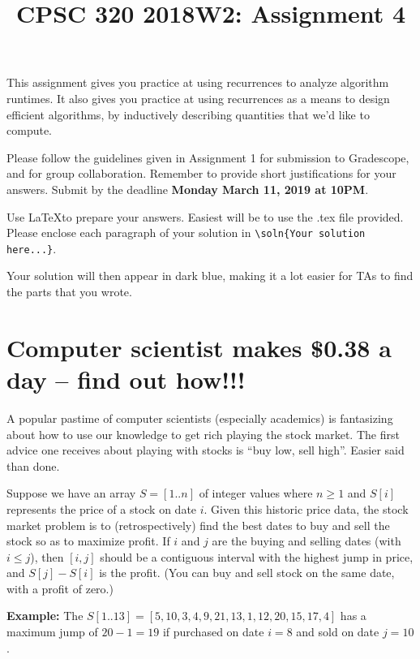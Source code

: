 \documentclass[11pt]{article}
\date{}
\title{CPSC 320 2018W2: Assignment 4}
\def\soln#1{\par\blu{#1}} %
\def\blu#1{{\color{blu}#1}}
\begin{document}
\maketitle
\vspace{-0.5in}

This assignment gives you practice at using recurrences to analyze
algorithm runtimes. It also gives you practice at using recurrences as
a means to design efficient algorithms, by inductively describing
quantities that we'd like to compute.

Please follow the guidelines given in Assignment 1 for submission to
Gradescope, and for group collaboration. Remember to provide short
justifications for your answers. Submit by the deadline \textbf{Monday 
March 11, 2019 at 10PM}.

Use \LaTeX to prepare your answers. Easiest will be to use the .tex
file provided.  Please enclose each paragraph of your solution in
\verb~\soln{Your solution here...}~.  \soln{Your solution will then appear in dark blue}, making it a lot easier for TAs to find the parts that you wrote.

\section{Computer scientist makes \$0.38 a day -- find out how!!!}
\label{sec-1}

A popular pastime of computer scientists (especially academics) is
fantasizing about how to use our knowledge to get rich playing the
stock market. The first advice one receives about playing with stocks
is ``buy low, sell high''.  Easier said than done.

Suppose we have an array $S=[1..n]$ of integer values where $n \ge 1$ and $S[i]$
represents the price of a stock on date $i$. Given this historic price
data, the stock market problem is to (retrospectively) find the best dates to buy and sell
the stock so as to maximize profit. If $i$ and $j$ are the buying and
selling dates (with $i \le j$), then $[i,j]$ should be a contiguous
interval with the highest jump in price, and $S[j] - S[i]$ is the
profit.  (You can buy and sell stock on the same date, with a profit of
zero.)

\vspace{.1in}

\noindent
\textbf{Example:} The $S[1..13]= [5,10,3,4,9,21,13,1,12,20,15,17,4]$ has a
maximum jump of $20-1 = 19$ if purchased on date $i=8$ and sold on date $j=10$.
\end{document}
